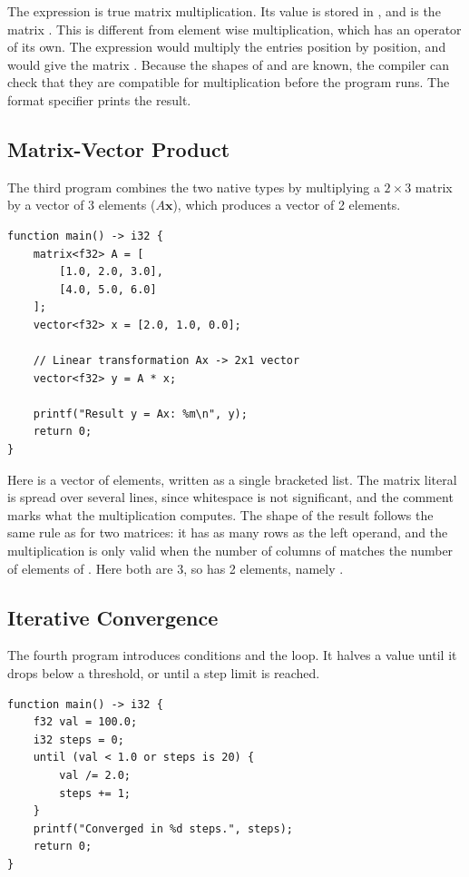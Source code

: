 The expression  is true matrix multiplication. Its value is
stored in , and is the matrix \code{[[19, 22], [43, 50]]}. This
is different from element wise multiplication, which has an operator of its own.
The expression  would multiply the entries position by position,
and would give the matrix \code{[[5, 12], [21, 32]]}. Because the shapes
of  and  are known, the compiler can check that they are
compatible for multiplication before the program runs. The format specifier
 prints the result.

\subsection{Matrix-Vector Product}

The third program combines the two native types by multiplying a $2 \times 3$
matrix by a vector of 3 elements ($A\mathbf{x}$), which produces a vector of
2 elements.

\begin{lstlisting}
function main() -> i32 {
    matrix<f32> A = [
        [1.0, 2.0, 3.0],
        [4.0, 5.0, 6.0]
    ];
    vector<f32> x = [2.0, 1.0, 0.0];

    // Linear transformation Ax -> 2x1 vector
    vector<f32> y = A * x;

    printf("Result y = Ax: %m\n", y);
    return 0;
}
\end{lstlisting}

Here  is a vector of  elements, written as a
single bracketed list. The matrix literal is spread over several lines, since
whitespace is not significant, and the comment marks what the multiplication
computes. The shape of the result follows the same rule as for two matrices:
it has as many rows as the left operand, and the multiplication is only valid
when the number of columns of  matches the number of elements of
. Here both are 3, so  has 2 elements, namely
\code{[4.0, 13.0]}.

\subsection{Iterative Convergence}

The fourth program introduces conditions and the  loop. It halves a
value until it drops below a threshold, or until a step limit is reached.

\begin{lstlisting}
function main() -> i32 {
    f32 val = 100.0;
    i32 steps = 0;
    until (val < 1.0 or steps is 20) {
        val /= 2.0;
        steps += 1;
    }
    printf("Converged in %d steps.", steps);
    return 0;
}
\end{lstlisting}

